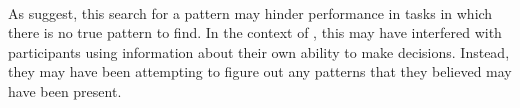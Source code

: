 \documentclass[12pt]{article}
\begin{document}

\paragraph{} As \cite{wolford2004searching} suggest, this search for a pattern may hinder performance in tasks in which there is no true pattern to find. In the context of \cite{clarke2015failure}, this may have interfered with participants using information about their own ability to make decisions. Instead, they may have been attempting to figure out any patterns that they believed may have been present. %


\end{document}
